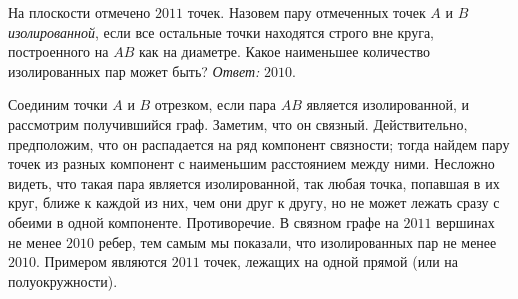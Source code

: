 \problem
На плоскости отмечено $2011$ точек.
Назовем пару отмеченных точек $A$ и $B$ \emph{изолированной}, если все остальные
точки находятся строго вне круга, построенного на $AB$ как на диаметре.
Какое наименьшее количество изолированных пар может быть?
\solution
\emph{Ответ:} $2010$.
\par
Соединим точки $A$ и $B$ отрезком, если пара $AB$ является изолированной, и
рассмотрим получившийся граф.
Заметим, что он связный.
Действительно, предположим, что он распадается на ряд компонент связности;
тогда найдем пару точек из разных компонент с наименьшим расстоянием между
ними.
Несложно видеть, что такая пара является изолированной, так любая точка,
попавшая в их круг, ближе к каждой из них, чем они друг к другу, но не может
лежать сразу с обеими в одной компоненте.
Противоречие.
В связном графе на $2011$ вершинах не менее $2010$ ребер, тем самым мы
показали, что изолированных пар не менее $2010$.
Примером являются $2011$ точек, лежащих на одной прямой (или на
полуокружности).
\endproblem
